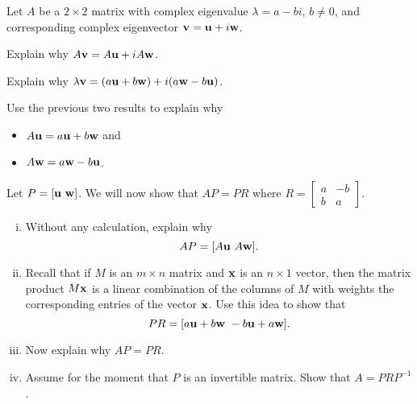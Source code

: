 \begin{activity} \label{act:4e_4} Let $A$ be a $2\times 2$ matrix with complex eigenvalue $\lambda=a-bi$, $b\neq 0$, and corresponding complex eigenvector $\mathbf{v}=\mathbf{u}+i\mathbf{w}$.

	\ba
	\item Explain why $A\mathbf{v} = A\mathbf{u}+iA\mathbf{w}$.
	
	
	\item Explain why $\lambda\mathbf{v} = (a\mathbf{u}+b\mathbf{w})+i (a\mathbf{w}-b\mathbf{u})$.
		
	
		
	\item Use the previous two results to explain why 
	\begin{itemize}
	\item $A\mathbf{u}=a\mathbf{u}+b\mathbf{w}$ and 
	\item $A\mathbf{w} = a\mathbf{w} - b\mathbf{u}$.
	\end{itemize}
	
	
	
	\item Let $P=[ \mathbf{u} \ \mathbf{w} ]$. We will now show that $AP=PR$ where $R=\left[ \begin{array}{cr} a&-b \\ b&a \end{array} \right]$.
	
	\begin{enumerate}[i.]
	\item Without any calculation, explain why
\[AP = [ A\mathbf{u} \  A\mathbf{w} ].\]



	\item Recall that if $M$ is an $m \times n$ matrix and $\mathbf{x}$ is an $n \times 1$ vector, then the matrix product $M\mathbf{x}$ is a linear combination of the columns of $M$ with weights the corresponding entries of the vector $\mathbf{x}$. Use this idea to show that
\[PR = [ a\mathbf{u} + b\mathbf{w} \  -b\mathbf{u} + a\mathbf{w} ].\]



	\item Now explain why $AP = PR$.
	
	
	
	\item Assume for the moment that $P$ is an invertible matrix. Show that $A = PRP^{-1}$.
	
	
	
	\end{enumerate}
				
	\ea
\end{activity}



